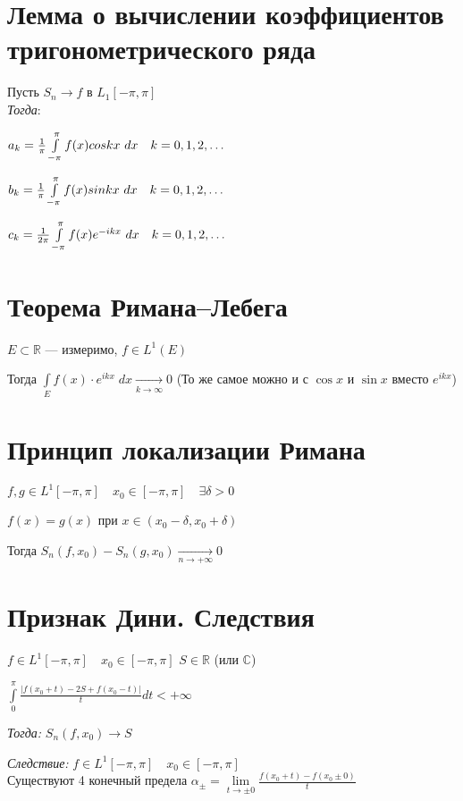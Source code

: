 \documentclass[paper=a4, fontsize=17pt]{article}
\begin{document}
\section{Лемма о вычислении коэффициентов тригонометрического ряда}

Пусть $S_n \rightarrow f$ в $L_1[-\pi, \pi]$\\ 

\emph{Тогда}:

$a_k = \frac{1}{\pi}\int\limits_{-\pi}^{\pi}f(x)coskx\ dx \quad k = 0, 1, 2, \mathellipsis$

$b_k = \frac{1}{\pi}\int\limits_{-\pi}^{\pi}f(x)sinkx\ dx \quad k = 0, 1, 2, \mathellipsis$

$c_k = \frac{1}{2\pi}\int\limits_{-\pi}^{\pi}f(x)e^{-ikx}\ dx \quad k = 0, 1, 2, \mathellipsis$

\section{Теорема Римана--Лебега}

$E \subset \mathbb{R}$ — измеримо, $f \in L^1(E)$

Тогда $\displaystyle\int\limits_E {f(x) \cdot e^{ikx} \; dx} \xrightarrow[k \to \infty]{} 0$ (То же самое можно и с $\cos {x}$ и $\sin {x}$ вместо $e^{ikx}$)

\section{Принцип локализации Римана}

$f, g \in L^1[-\pi, \pi] \quad x_0 \in [-\pi, \pi] \quad \exists \delta > 0$

$f(x) = g(x) $ при $ x \in (x_0 - \delta, x_0 + \delta)$

Тогда $S_n(f, x_0) - S_n(g, x_0) \xrightarrow[n \to +\infty]{} 0$

\section{Признак Дини. Следствия}

$f \in L^1[-\pi, \pi] \quad x_0 \in [-\pi, \pi] $
$S \in \mathbb R $ (или $\mathbb C$)

$\int\limits_0^{\pi} \frac{\lvert f(x_0 + t) - 2S + f(x_0 - t) \rvert}{t} dt < +\infty$

\emph{Тогда:} $S_n(f, x_0) \rightarrow S$

\emph{Следствие:}
$f \in L^1[-\pi, \pi] \quad x_0 \in [-\pi, \pi] $\\
Существуют 4 конечный предела $\alpha_{\pm} = \lim\limits_{t\rightarrow \pm 0} \frac{f(x_0 + t) - f(x_0 \pm 0)}{t}$
\end{document}
